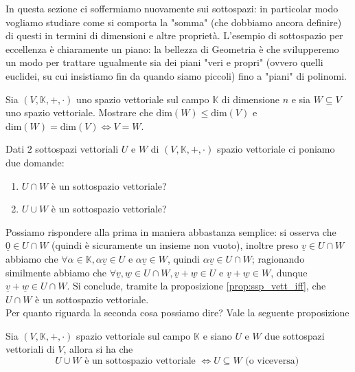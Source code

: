 In questa sezione ci soffermiamo nuovamente sui sottospazi: in particolar modo vogliamo studiare come si comporta la "somma" (che dobbiamo ancora definire) di questi in termini di dimensioni e altre proprietà. L'esempio di sottospazio per eccellenza è chiaramente un piano: la bellezza di Geometria è che svilupperemo un modo per trattare ugualmente sia dei piani "veri e propri" (ovvero quelli euclidei, su cui insistiamo fin da quando siamo piccoli) fino a "piani" di polinomi. \\
\begin{exercise}
    Sia $(V, \mathbb{K}, +, \cdot)$ uno spazio vettoriale sul campo $\mathbb{K}$ di dimensione $n$ e sia $W \subseteq V$ uno spazio vettoriale. Mostrare che $\text{dim} (W) \leq \text{dim}(V)$ e $\text{dim}(W) = \text{dim}(V) \iff V = W$.
    \label{ex:1.10}
\end{exercise}
Dati $2$ sottospazi vettoriali $U$ e $W$ di $(V, \mathbb{K}, +, \cdot)$ spazio vettoriale ci poniamo due domande:
\begin{enumerate}[label=\protect\circled{\arabic*}]
    \item $U \cap W$ è un sottospazio vettoriale?
    \item $U \cup W$ è un sottospazio vettoriale?
\end{enumerate}
Possiamo rispondere alla prima in maniera abbastanza semplice: si osserva che $\underline{0} \in U \cap W$ (quindi è sicuramente un insieme non vuoto), inoltre preso $\underline{v} \in U \cap W$ abbiamo che $\forall \alpha \in \mathbb{K}, \alpha \underline{v} \in U$ e $\alpha \underline{v} \in W$, quindi $\alpha \underline{v} \in U \cap W$; ragionando similmente abbiamo che $\forall \underline{v}, \underline{w} \in U \cap W, \underline{v} + \underline{w} \in U$ e $\underline{v} + \underline{w} \in W$, dunque $\underline{v} + \underline{w} \in U \cap W$.
Si conclude, tramite la proposizione \ref{prop:ssp_vett_iff}, che $U \cap W$ è un sottospazio vettoriale. \\
Per quanto riguarda la seconda cosa possiamo dire? Vale la seguente proposizione
\begin{prop}
    Sia $(V, \mathbb{K}, +, \cdot)$ spazio vettoriale sul campo $\mathbb{K}$ e siano $U$ e $W$ due sottospazi vettoriali di $V$, allora si ha che \\
    $$
    U \cup W \text{ è un sottospazio vettoriale } \iff U \subseteq W \text{ (o viceversa) }
    $$
\end{prop}
